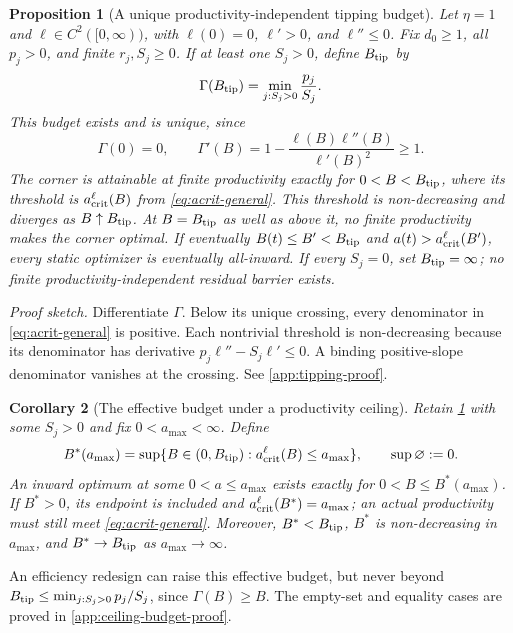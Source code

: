 \documentclass[11pt,a4paper]{article}
\newtheorem{proposition}{Proposition}
\newtheorem{corollary}[proposition]{Corollary}
\theoremstyle{definition}\newtheorem{definition}{Definition}
\begin{document}
\begin{proposition}[A unique productivity-independent tipping budget]
\label{prop:tipping}
Let $\eta=1$ and $\ell\in C^2([0,\infty))$, with $\ell(0)=0$,
$\ell'>0$, and $\ell''\leq0$. Fix $d_0\geq1$, all $p_j>0$, and finite
$r_j,S_j\geq0$. If at least one $S_j>0$, define $B_{\rm tip}$ by
\begin{equation}
 \Gamma(B_{\rm tip})=\min_{j:S_j>0}\frac{p_j}{S_j}.
 \label{eq:tipping-budget}
\end{equation}
This budget exists and is unique, since
\begin{equation}
 \Gamma(0)=0,\qquad
 \Gamma'(B)=1-\frac{\ell(B)\ell''(B)}{\ell'(B)^2}\geq1.
 \label{eq:gamma-monotone}
\end{equation}
The corner is attainable at finite productivity exactly for
$0<B<B_{\rm tip}$, where its threshold is
$a_{\rm crit}^{\ell}(B)$ from \cref{eq:acrit-general}.
This threshold is non-decreasing and diverges as
$B\uparrow B_{\rm tip}$. At $B=B_{\rm tip}$ as well as above it,
no finite productivity makes the corner optimal.
If eventually $B(t)\leq B'<B_{\rm tip}$ and
$a(t)>a_{\rm crit}^{\ell}(B')$, every static optimizer is eventually
all-inward. If every $S_j=0$, set
$B_{\rm tip}=\infty$; no finite productivity-independent residual
barrier exists.
\end{proposition}
\noindent\emph{Proof sketch.}
Differentiate $\Gamma$. Below its unique crossing, every denominator
in \cref{eq:acrit-general} is positive. Each nontrivial threshold is
non-decreasing because its denominator has derivative
$p_j\ell''-S_j\ell'\leq0$. A binding positive-slope denominator
vanishes at the crossing. See \cref{app:tipping-proof}.

\begin{corollary}[The effective budget under a productivity ceiling]
\label{cor:ceiling-budget}
Retain \cref{prop:tipping} with some $S_j>0$ and fix
$0<a_{\max}<\infty$. Define
\begin{equation}
 B^*(a_{\max})=\sup\{B\in(0,B_{\rm tip}):
                     a_{\rm crit}^{\ell}(B)\leq a_{\max}\},
 \qquad \sup\varnothing:=0.
 \label{eq:ceiling-budget}
\end{equation}
An inward optimum at some $0<a\leq a_{\max}$ exists exactly for
$0<B\leq B^*(a_{\max})$. If $B^*>0$, its endpoint is included and
$a_{\rm crit}^{\ell}(B^*)=a_{\max}$; an actual productivity must still
meet \cref{eq:acrit-general}. Moreover, $B^*<B_{\rm tip}$,
$B^*$ is non-decreasing in $a_{\max}$, and $B^*\to B_{\rm tip}$ as
$a_{\max}\to\infty$.
\end{corollary}
An efficiency redesign can raise this effective budget, but never beyond
$B_{\rm tip}\leq\min_{j:S_j>0}p_j/S_j$, since $\Gamma(B)\geq B$.
The empty-set and equality cases are proved in \cref{app:ceiling-budget-proof}.
\end{document}
